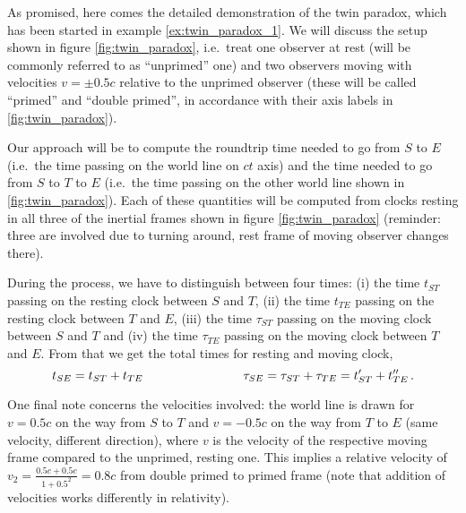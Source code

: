 \begin{ex}\label{ex:twin_paradox_2}
As promised, here comes the detailed demonstration of the twin paradox, which has been started in example \ref{ex:twin_paradox_1}. We will discuss the setup shown in figure \ref{fig:twin_paradox}, i.e.~treat one observer at rest (will be commonly referred to as \enquote{unprimed} one) and two observers moving with velocities $v = \pm 0.5 c$ relative to the unprimed observer (these will be called \enquote{primed} and \enquote{double primed}, in accordance with their axis labels in \ref{fig:twin_paradox}).

Our approach will be to compute the roundtrip time needed to go from $S$ to $E$ (i.e.~the time passing on the world line on $ct$ axis) and the time needed to go from $S$ to $T$ to $E$ (i.e.~the time passing on the other world line shown in \ref{fig:twin_paradox}). Each of these quantities will be computed from clocks resting in all three of the inertial frames shown in figure \ref{fig:twin_paradox} (reminder: three are involved due to turning around, rest frame of moving observer changes there).


During the process, we have to distinguish between four times: (i) the time $t_{ST}$ passing on the resting clock between $S$ and $T$, (ii) the time $t_{TE}$ passing on the resting clock between $T$ and $E$, (iii) the time $\tau_{ST}$ passing on the moving clock between $S$ and $T$ and (iv) the time $\tau_{TE}$ passing on the moving clock between $T$ and $E$. From that we get the total times for resting and moving clock,
\begin{equation*}
t_{SE} = t_{ST} + t_{TE}
\qquad \qquad \qquad \qquad
\tau_{SE} = \tau_{ST} + \tau_{TE} = t'_{ST} + t''_{TE} \, .
\end{equation*}

One final note concerns the velocities involved: the world line is drawn for $v = 0.5 c$ on the way from $S$ to $T$ and $v = -0.5 c$ on the way from $T$ to $E$ (same velocity, different direction), where $v$ is the velocity of the respective moving frame compared to the unprimed, resting one. This implies a relative velocity of $v_2 = \frac{0.5 c + 0.5 c}{1 + 0.5^2} = 0.8 c$ from double primed to primed frame (note that addition of velocities works differently in relativity).


\end{ex}
